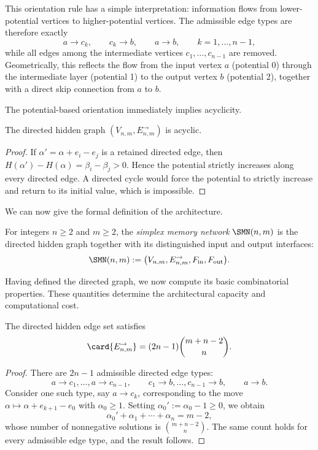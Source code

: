 This orientation rule has a simple interpretation: information flows from lower-potential vertices to higher-potential vertices. The admissible edge types are therefore exactly
\[
a\to c_k,\qquad c_k\to b,\qquad a\to b,
\qquad k=1,\dots,n-1,
\]
while all edges among the intermediate vertices $c_1,\dots,c_{n-1}$ are removed. Geometrically, this reflects the flow from the input vertex $a$ (potential 0) through the intermediate layer (potential 1) to the output vertex $b$ (potential 2), together with a direct skip connection from $a$ to $b$.

The potential-based orientation immediately implies acyclicity.

\begin{proposition}[Acyclicity]
The directed hidden graph $(V_{n,m},E^{\rightarrow}_{n,m})$ is acyclic.
\end{proposition}

\begin{proof}
If $\alpha' = \alpha + e_i-e_j$ is a retained directed edge, then $H(\alpha')-H(\alpha)=\beta_i-\beta_j > 0$. Hence the potential strictly increases along every directed edge. A directed cycle would force the potential to strictly increase and return to its initial value, which is impossible.
\end{proof}

We can now give the formal definition of the architecture.

\begin{definition}
For integers $n\geq 2$ and $m\geq 2$, the \emph{simplex memory network} $\SMN(n,m)$ is the directed hidden graph together with its distinguished input and output interfaces:
\[
\SMN(n,m)
:=
\bigl(V_{n,m}, E^{\rightarrow}_{n,m}, F_{\mathrm{in}}, F_{\mathrm{out}}\bigr).
\]
\end{definition}

Having defined the directed graph, we now compute its basic combinatorial properties. These quantities determine the architectural capacity and computational cost.

\begin{proposition}
The directed hidden edge set satisfies
\[
\card{E^{\rightarrow}_{n,m}} = (2n-1)\binom{m+n-2}{n}.
\]
\end{proposition}

\begin{proof}
There are $2n-1$ admissible directed edge types:
\[
a\to c_1,\dots,a\to c_{n-1},\qquad c_1\to b,\dots,c_{n-1}\to b,\qquad a\to b.
\]
Consider one such type, say $a\to c_k$, corresponding to the move $\alpha \mapsto \alpha + e_{k+1}-e_0$ with $\alpha_0\geq 1$. Setting $\alpha_0' := \alpha_0-1\geq 0$, we obtain
\[
\alpha_0' + \alpha_1 + \cdots + \alpha_n = m-2,
\]
whose number of nonnegative solutions is $\binom{m+n-2}{n}$. The same count holds for every admissible edge type, and the result follows.
\end{proof}

